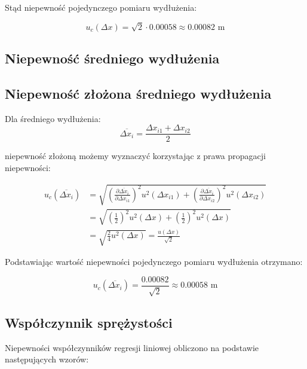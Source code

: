 \documentclass[a4paper,12pt]{article}
\begin{document}
Stąd niepewność pojedynczego pomiaru wydłużenia:

\begin{equation*}
    u_c(\Delta x) = \sqrt{2} \cdot 0.00058 \approx 0.00082 \text{ m}
\end{equation*}

\subsection{Niepewność średniego wydłużenia}

\subsection*{Niepewność złożona średniego wydłużenia}

Dla średniego wydłużenia:
\begin{equation*}
    \overline{\Delta x_i} = \frac{\Delta x_{i1} + \Delta x_{i2}}{2}
\end{equation*}

niepewność złożoną możemy wyznaczyć korzystając z prawa propagacji niepewności:

\begin{align*}
    u_c(\overline{\Delta x_i}) & = \sqrt{\left(\frac{\partial \overline{\Delta x_i}}{\partial \Delta x_{i1}}\right)^2 u^2(\Delta x_{i1}) + \left(\frac{\partial \overline{\Delta x_i}}{\partial \Delta x_{i2}}\right)^2 u^2(\Delta x_{i2})} \\
                               & = \sqrt{\left(\frac{1}{2}\right)^2 u^2(\Delta x) + \left(\frac{1}{2}\right)^2 u^2(\Delta x)}                                                                                                               \\
                               & = \sqrt{\frac{2}{4} u^2(\Delta x)} = \frac{u(\Delta x)}{\sqrt{2}}
\end{align*}

Podstawiając wartość niepewności pojedynczego pomiaru wydłużenia otrzymano:

\begin{equation*}
    u_c(\overline{\Delta x_i}) = \frac{0.00082}{\sqrt{2}} \approx 0.00058 \text{ m}
\end{equation*}


\subsection{Współczynnik sprężystości}

Niepewności współczynników regresji liniowej obliczono na podstawie następujących wzorów:
\end{document}
